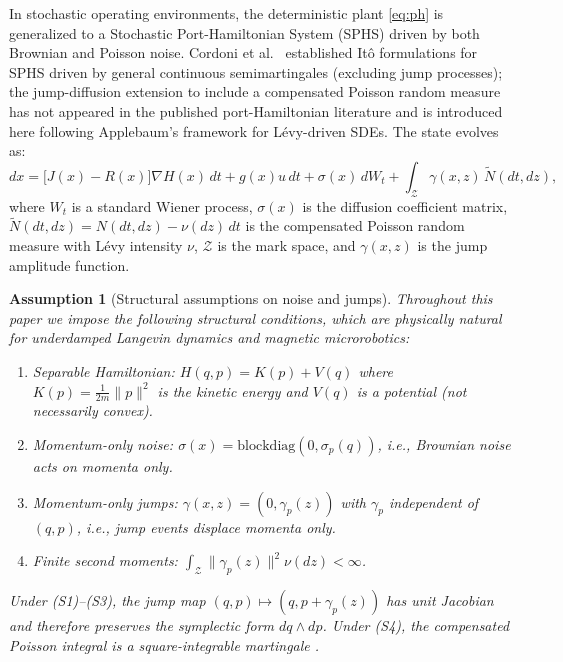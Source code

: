 \documentclass[11pt]{article}
\newtheorem{assumption}{Assumption}
\begin{document}
In stochastic operating environments, the deterministic plant \eqref{eq:ph} is generalized to a
Stochastic Port-Hamiltonian System (SPHS) driven by both Brownian and Poisson noise.
Cordoni et al.\ \cite{cordoni2022} established It\^{o} formulations for SPHS driven by general
continuous semimartingales (excluding jump processes); the jump-diffusion extension to include
a compensated Poisson random measure has not appeared in the published port-Hamiltonian
literature and is introduced here following Applebaum's \cite{applebaum2009} framework for
L\'{e}vy-driven SDEs. The state evolves as:
\begin{equation}
dx = \bigl[J(x)-R(x)\bigr]\nabla H(x)\,dt + g(x)u\,dt + \sigma(x)\,dW_t
    + \int_{\mathcal{Z}} \gamma(x,z)\,\tilde{N}(dt,dz),
\label{eq:sphs}
\end{equation}
where $W_t$ is a standard Wiener process, $\sigma(x)$ is the diffusion coefficient matrix,
$\tilde{N}(dt,dz)=N(dt,dz)-\nu(dz)\,dt$ is the compensated Poisson random measure with
L\'{e}vy intensity $\nu$, $\mathcal{Z}$ is the mark space, and $\gamma(x,z)$ is the jump amplitude function.

\begin{assumption}[Structural assumptions on noise and jumps]
\label{ass:struct}
Throughout this paper we impose the following structural conditions, which are physically
natural for underdamped Langevin dynamics and magnetic microrobotics:
\begin{enumerate}
\item[(S1)] \emph{Separable Hamiltonian}: $H(q,p)=K(p)+V(q)$ where $K(p)=\tfrac{1}{2m}\|p\|^2$
  is the kinetic energy and $V(q)$ is a potential (not necessarily convex).
\item[(S2)] \emph{Momentum-only noise}: $\sigma(x)=\mathrm{blockdiag}(0,\sigma_p(q))$,
  i.e., Brownian noise acts on momenta only.
\item[(S3)] \emph{Momentum-only jumps}: $\gamma(x,z)=(0,\gamma_p(z))$ with $\gamma_p$
  independent of $(q,p)$, i.e., jump events displace momenta only.
\item[(S4)] \emph{Finite second moments}: $\int_{\mathcal{Z}}\|\gamma_p(z)\|^2\nu(dz)<\infty$.
\end{enumerate}
Under (S1)--(S3), the jump map $(q,p)\mapsto(q,p+\gamma_p(z))$ has unit Jacobian and
therefore preserves the symplectic form $dq\wedge dp$. Under (S4), the compensated Poisson
integral is a square-integrable martingale \cite{applebaum2009}.
\end{assumption}
\end{document}

